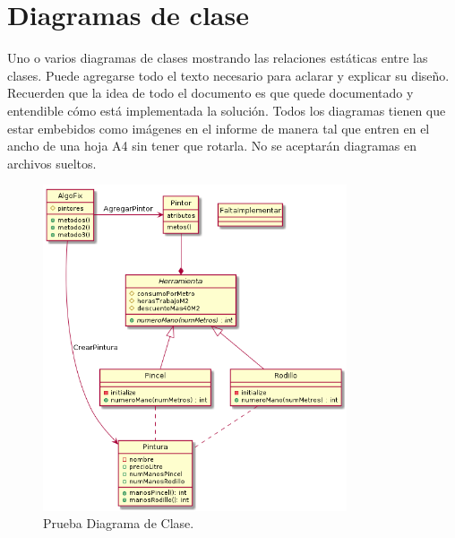 \documentclass[titlepage,a4paper]{article}
\begin{document}
\section{Diagramas de clase}\label{sec:diagramasdeclase}
Uno o varios diagramas de clases mostrando las relaciones estáticas entre las clases.  
Puede agregarse todo el texto necesario para aclarar y explicar su diseño. 
Recuerden que la idea de todo el documento es que quede documentado y entendible cómo está implementada la solución. 
Todos los diagramas tienen que estar embebidos como imágenes en el informe de manera tal que entren en el ancho de una hoja A4 
sin tener que rotarla.  No se aceptarán diagramas en archivos sueltos. 


\begin{figure}[H]
  \centering
  \includegraphics[width=0.8\textwidth]{test.png}
  \caption{\label{fig:class02}Prueba Diagrama de Clase.}
  \end{figure}

\end{document}
